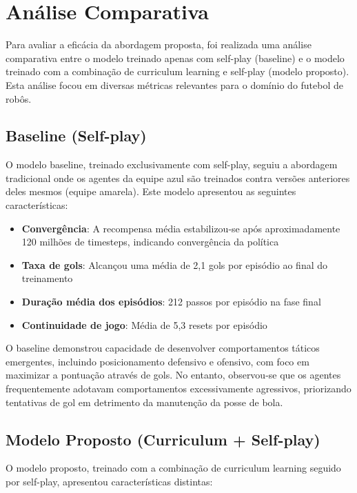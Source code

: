 \section{Análise Comparativa}
\label{sec:analise_comparativa}

Para avaliar a eficácia da abordagem proposta, foi realizada uma análise comparativa entre o modelo treinado apenas com self-play (baseline) e o modelo treinado com a combinação de curriculum learning e self-play (modelo proposto). Esta análise focou em diversas métricas relevantes para o domínio do futebol de robôs.

\subsection{Baseline (Self-play)}

O modelo baseline, treinado exclusivamente com self-play, seguiu a abordagem tradicional onde os agentes da equipe azul são treinados contra versões anteriores deles mesmos (equipe amarela). Este modelo apresentou as seguintes características:

\begin{itemize}
    \item \textbf{Convergência}: A recompensa média estabilizou-se após aproximadamente 120 milhões de timesteps, indicando convergência da política
    \item \textbf{Taxa de gols}: Alcançou uma média de 2,1 gols por episódio ao final do treinamento
    \item \textbf{Duração média dos episódios}: 212 passos por episódio na fase final
    \item \textbf{Continuidade de jogo}: Média de 5,3 resets por episódio
\end{itemize}

O baseline demonstrou capacidade de desenvolver comportamentos táticos emergentes, incluindo posicionamento defensivo e ofensivo, com foco em maximizar a pontuação através de gols. No entanto, observou-se que os agentes frequentemente adotavam comportamentos excessivamente agressivos, priorizando tentativas de gol em detrimento da manutenção da posse de bola.

\subsection{Modelo Proposto (Curriculum + Self-play)}

O modelo proposto, treinado com a combinação de curriculum learning seguido por self-play, apresentou características distintas:

